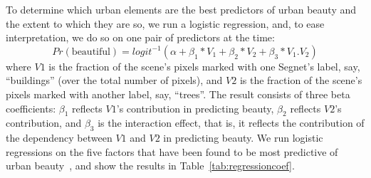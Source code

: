 \begin{table}[t!]
    \centering
    \caption{Coefficients of logistic regressions run on one pair of predictors at the time.}
    \label{tab:regressioncoef}
    \vspace{-10mm}
\end{table}


To determine which urban elements are the best predictors of urban beauty and the extent to which they are so, we run a logistic regression, and, to ease interpretation, we do so on one pair of predictors at the time: 
\begin{equation}
Pr(\textrm{beautiful}) = logit^{-1}(\alpha + \beta_1 * V_1 + \beta_2 * V_2  + \beta_3 * V_{1}.V_{2} )
\label{eq:regression} 
\end{equation}
where $V1$ is the fraction of the scene's pixels marked with one Segnet's label, say, ``buildings'' (over the total number of pixels),  and $V2$ is the fraction of the scene's pixels marked with another label, say, ``trees''. The result consists of three beta coefficients: $\beta_1$ reflects $V1$'s contribution in predicting beauty,  $\beta_2$ reflects $V2$'s contribution, and $\beta_3$ is the interaction effect, that is, it reflects the contribution of the dependency between $V1$ and $V2$ in predicting beauty. We run logistic regressions on the five factors that have been found to be most predictive of urban beauty~\cite{quercia2014aesthetic, ewing2013measuring, alexander1977pattern}, and show the results in Table~\ref{tab:regressioncoef}.


